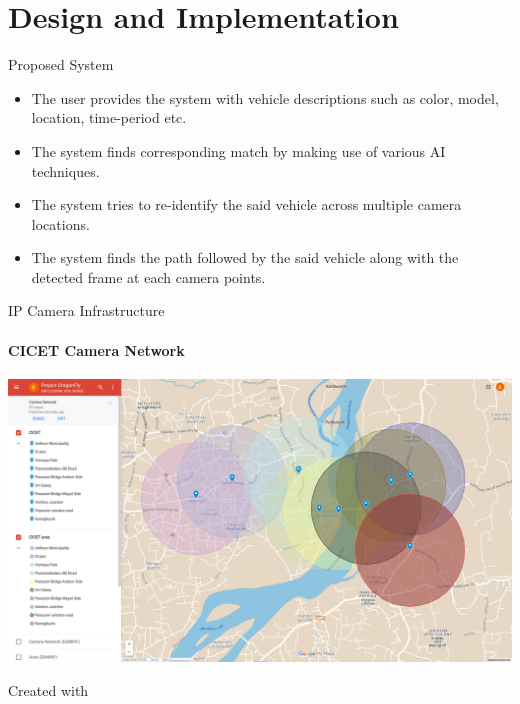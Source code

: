 \documentclass{beamer}
\newcommand{\link}[2]{\href{#1}{\textit{\color{blue}{#2}}}}%
\begin{document}
	
	
	\section{Design and Implementation}
	\begin{frame}{Proposed System}
		\begin{itemize}
			\item The user provides the system with vehicle descriptions such as color, model, location, time-period etc. 
			\item The system finds corresponding match by making use of various AI techniques. 
			\item The system tries to re-identify the said vehicle across multiple camera locations.
			\item The system finds the path followed by the said vehicle along with the detected frame at each camera points.
		\end{itemize}
	\end{frame}

	\begin{frame}{IP Camera Infrastructure}
		\framesubtitle{CICET Camera Network}
		\begin{center}
			\includegraphics[height=0.7\textheight]{res/camera-network.png}
		\end{center}
		Created with \link{https://www.google.com/maps/d/edit?mid=1s2ST5x4nn-EK3JqU-c9EEGASRq5Ini0&usp=sharing}{Google Maps}
	\end{frame}
	
\end{document}
